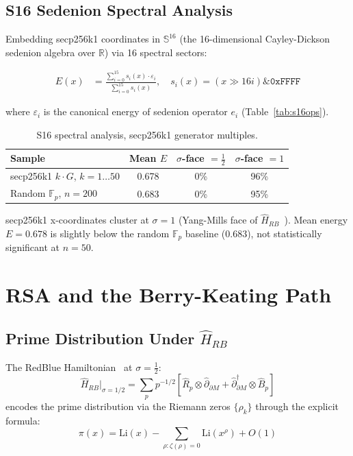 \documentclass[runningheads]{llncs}
\theoremstyle{plain}
\theoremstyle{definition}
\newcommand{\Fp}{\mathbb{F}_p}
\begin{document}
\subsection{S16 Sedenion Spectral Analysis}

Embedding secp256k1 coordinates in $\mathbb{S}^{16}$ (the 16-dimensional
Cayley-Dickson sedenion algebra over $\mathbb{R}$) via 16 spectral sectors:

\begin{align*}
E(x) &= \frac{\sum_{i=0}^{15} s_i(x) \cdot \varepsilon_i}{\sum_{i=0}^{15} s_i(x)}, \quad
s_i(x) = (x \gg 16i) \mathbin{\&} \mathtt{0xFFFF}
\end{align*}

where $\varepsilon_i$ is the canonical energy of sedenion operator $e_i$
(Table~\ref{tab:s16ops}).

\begin{table}[h]
\centering
\caption{S16 spectral analysis, secp256k1 generator multiples.}
\label{tab:s16}
\begin{tabular}{lccc}
\toprule
Sample & Mean $E$ & $\sigma$-face $= \frac{1}{2}$ & $\sigma$-face $= 1$ \\
\midrule
secp256k1 $k \cdot G$, $k=1\ldots 50$ & 0.678 & 0\% & 96\% \\
Random $\Fp$, $n=200$ & 0.683 & 0\% & 95\% \\
\bottomrule
\end{tabular}
\end{table}

secp256k1 x-coordinates cluster at $\sigma = 1$ (Yang-Mills face of
$\hat{H}_{RB}$~\cite{Allison2026}). Mean energy $E = 0.678$ is slightly
below the random $\Fp$ baseline ($0.683$), not statistically significant
at $n=50$.


\section{RSA and the Berry-Keating Path}
\label{sec:rsa}

\subsection{Prime Distribution Under $\hat{H}_{RB}$}

The RedBlue Hamiltonian~\cite{Allison2026} at $\sigma = \frac{1}{2}$:
\[
\hat{H}_{RB}\big|_{\sigma=1/2} = \sum_p p^{-1/2}
\left[\hat{R}_p \otimes \hat{\partial}_{\partial M} +
\hat{\partial}_{\partial M}^\dagger \otimes \hat{B}_p\right]
\]
encodes the prime distribution via the Riemann zeros $\{\rho_k\}$ through the
explicit formula:
\[
\pi(x) = \mathrm{Li}(x) - \sum_{\rho: \zeta(\rho)=0} \mathrm{Li}(x^\rho) + O(1)
\]
\end{document}
